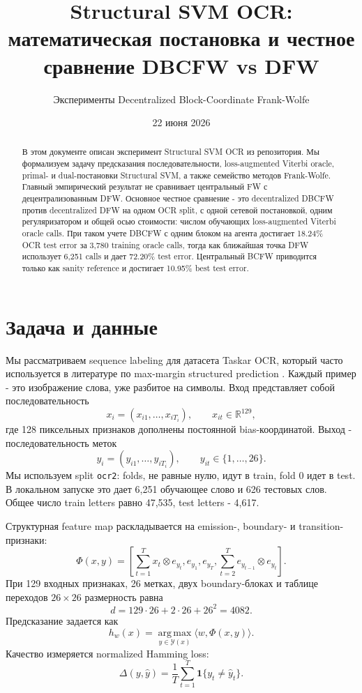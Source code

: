 \documentclass[11pt,a4paper]{article}
\title{\textbf{Structural SVM OCR: математическая постановка и честное сравнение DBCFW vs DFW}}
\author{Эксперименты Decentralized Block-Coordinate Frank-Wolfe}
\date{22 июня 2026}
\newcommand{\R}{\mathbb{R}}
\newcommand{\Y}{\mathcal{Y}}
\newcommand{\argmax}{\operatorname*{arg\,max}}
\begin{document}
\maketitle

\begin{abstract}
В этом документе описан эксперимент Structural SVM OCR из репозитория. Мы формализуем задачу предсказания последовательности, loss-augmented Viterbi oracle, primal- и dual-постановки Structural SVM, а также семейство методов Frank-Wolfe. Главный эмпирический результат не сравнивает центральный FW с децентрализованным DFW. Основное честное сравнение - это decentralized DBCFW против decentralized DFW на одном OCR split, с одной сетевой постановкой, одним регуляризатором и общей осью стоимости: числом обучающих loss-augmented Viterbi oracle calls. При таком учете DBCFW с одним блоком на агента достигает 18.24\% OCR test error за 3,780 training oracle calls, тогда как ближайшая точка DFW использует 6,251 calls и дает 72.20\% test error. Центральный BCFW приводится только как sanity reference и достигает 10.95\% best test error.
\end{abstract}

\section{Задача и данные}

Мы рассматриваем sequence labeling для датасета Taskar OCR, который часто используется в литературе по max-margin structured prediction \citep{taskar2003maxmargin,lacostejulien2013bcfw}. Каждый пример - это изображение слова, уже разбитое на символы. Вход представляет собой последовательность
\[
  x_i = (x_{i1},\ldots,x_{iT_i}), \qquad x_{it}\in\R^{129},
\]
где 128 пиксельных признаков дополнены постоянной bias-координатой. Выход - последовательность меток
\[
  y_i = (y_{i1},\ldots,y_{iT_i}), \qquad y_{it}\in\{1,\ldots,26\}.
\]
Мы используем split \texttt{ocr2}: folds, не равные нулю, идут в train, fold 0 идет в test. В локальном запуске это дает 6,251 обучающее слово и 626 тестовых слов. Общее число train letters равно 47,535, test letters - 4,617.

Структурная feature map раскладывается на emission-, boundary- и transition-признаки:
\[
  \Phi(x,y) =
  \left[
    \sum_{t=1}^{T} x_t \otimes e_{y_t},
    e_{y_1},
    e_{y_T},
    \sum_{t=2}^{T} e_{y_{t-1}}\otimes e_{y_t}
  \right].
\]
При 129 входных признаках, 26 метках, двух boundary-блоках и таблице переходов \(26\times26\) размерность равна
\[
  d = 129\cdot 26 + 2\cdot 26 + 26^2 = 4082.
\]
Предсказание задается как
\[
  h_w(x) = \argmax_{y\in\Y(x)} \langle w,\Phi(x,y)\rangle .
\]
Качество измеряется normalized Hamming loss:
\[
  \Delta(y,\hat y) = \frac{1}{T}\sum_{t=1}^{T}\mathbf{1}\{y_t\neq \hat y_t\}.
\]
\end{document}
